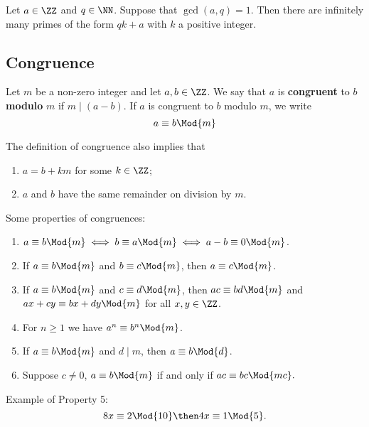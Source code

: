 \documentclass[12pt, a4paper]{article}
\begin{document}
\begin{mdthm}
    Let \(a \in \ZZ\) and \(q \in \NN\). Suppose that \(\gcd(a,q)=1\). Then there are infinitely many primes of the form \(qk+a\) with \(k\) a positive integer.
\end{mdthm}

\subsection{Congruence}

\begin{definition}
    Let \(m\) be a non-zero integer and let \(a,b \in \ZZ\). We say that \(a\) is \textbf{congruent} to \(b\) \textbf{modulo} \(m\) if \(m\mid (a-b).\) If \(a\) is congruent to \(b\) modulo \(m\), we write \[a\equiv b \Mod{m}\] 
\end{definition}

\begin{mdremark}
    The definition of congruence also implies that 
    \begin{enumerate}
        \item \(a = b+km\) for some \(k \in \ZZ\);
        \item \(a\) and \(b\) have the same remainder on division by \(m\).
    \end{enumerate}
\end{mdremark}

\begin{mdthm}
    Some properties of congruences:
    \begin{enumerate}
        \item \(a \equiv b \Mod{m} \iff b \equiv a \Mod{m} \iff a-b \equiv 0 \Mod{m}\).
        \item If \(a \equiv b \Mod{m}\) and \(b \equiv c \Mod{m}\), then \(a \equiv c \Mod{m}\).
        \item If \(a \equiv b \Mod{m}\) and \(c \equiv d \Mod{m}\), then \(ac \equiv bd \Mod{m}\) and \(ax+cy \equiv bx+dy \Mod{m}\) for all \(x,y \in \ZZ\).
        \item For \(n\geq 1\) we have \(a^n \equiv b^n \Mod{m}\).
        \item If \(a \equiv b \Mod{m}\) and \(d\mid m\), then \(a \equiv b \Mod{d}\).
        \item Suppose \(c\neq 0\), \(a \equiv b \Mod{m}\) if and only if \(ac \equiv bc \Mod{mc}.\)
    \end{enumerate}
\end{mdthm}

\begin{example}
    Example of Property 5: 
    \[8x \equiv 2 \Mod{10} \then 4x \equiv 1 \Mod{5}.\]
\end{example}
\end{document}
